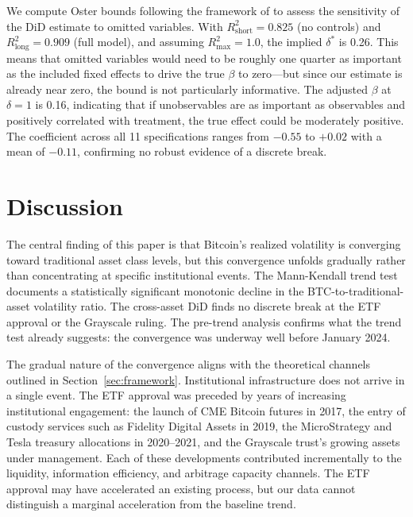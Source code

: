 \documentclass[12pt,a4paper]{article}
\begin{document}
We compute Oster bounds following the framework of \citet{abadie2020statistical}
to assess the sensitivity of the DiD estimate to omitted variables. With
$R^2_{\text{short}} = 0.825$ (no controls) and $R^2_{\text{long}} = 0.909$
(full model), and assuming $R^2_{\max} = 1.0$, the implied $\delta^*$ is
0.26. This means that omitted variables would need to be roughly one
quarter as important as the included fixed effects to drive the true
$\beta$ to zero---but since our estimate is already near zero, the bound is
not particularly informative. The adjusted $\beta$ at $\delta = 1$ is 0.16,
indicating that if unobservables are as important as observables and
positively correlated with treatment, the true effect could be moderately
positive. The coefficient across all 11 specifications ranges from $-0.55$
to $+0.02$ with a mean of $-0.11$, confirming no robust evidence of a
discrete break.

\FloatBarrier

\section{Discussion}\label{sec:discussion}

The central finding of this paper is that Bitcoin's realized volatility is
converging toward traditional asset class levels, but this convergence
unfolds gradually rather than concentrating at specific institutional
events. The Mann-Kendall trend test documents a statistically significant
monotonic decline in the BTC-to-traditional-asset volatility ratio. The
cross-asset DiD finds no discrete break at the ETF approval or the
Grayscale ruling. The pre-trend analysis confirms what the trend test
already suggests: the convergence was underway well before January 2024.

The gradual nature of the convergence aligns with the theoretical channels
outlined in Section~\ref{sec:framework}. Institutional infrastructure does
not arrive in a single event. The ETF approval was preceded by years of
increasing institutional engagement: the launch of CME Bitcoin futures in
2017, the entry of custody services such as Fidelity Digital Assets in
2019, the MicroStrategy and Tesla treasury allocations in 2020--2021, and
the Grayscale trust's growing assets under management. Each of these
developments contributed incrementally to the liquidity, information
efficiency, and arbitrage capacity channels. The ETF approval may have
accelerated an existing process, but our data cannot distinguish a
marginal acceleration from the baseline trend.
\end{document}
